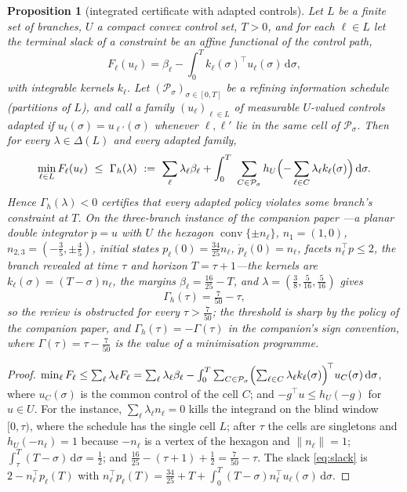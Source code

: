 \documentclass[11pt,a4paper]{article}
\theoremstyle{plain}
\newtheorem{proposition}[theorem]{Proposition}
\theoremstyle{definition}
\theoremstyle{remark}
\newcommand{\calP}{\mathcal{P}}
\newcommand{\conv}{\operatorname{conv}}
\newcommand{\tfr}[2]{\tfrac{#1}{#2}}
\newcommand{\dd}{\,\mathrm{d}}
\begin{document}
\begin{proposition}[integrated certificate with adapted controls]\label{prop:integrated}
Let $L$ be a finite set of branches, $U$ a compact convex control set, $T>0$, and for each $\ell\in L$ let the terminal slack of a constraint be an affine functional of the control path,
\begin{equation}\label{eq:slack}
F_\ell(u_\ell)=\beta_\ell-\int_0^T k_\ell(\sigma)^\top u_\ell(\sigma)\dd\sigma,
\end{equation}
with integrable kernels $k_\ell$. Let $(\calP_\sigma)_{\sigma\in[0,T]}$ be a refining information schedule (partitions of $L$), and call a family $(u_\ell)_{\ell\in L}$ of measurable $U$-valued controls \emph{adapted} if $u_\ell(\sigma)=u_{\ell'}(\sigma)$ whenever $\ell,\ell'$ lie in the same cell of $\calP_\sigma$. Then for every $\lambda\in\Delta(L)$ and every adapted family,
\begin{equation}\label{eq:gammah}
\min_{\ell\in L}F_\ell(u_\ell)\ \le\ \Gamma_h(\lambda)\ :=\ \sum_\ell\lambda_\ell\beta_\ell+\int_0^T\ \sum_{C\in\calP_\sigma}h_U\Bigl(-\sum_{\ell\in C}\lambda_\ell k_\ell(\sigma)\Bigr)\dd\sigma .
\end{equation}
Hence $\Gamma_h(\lambda)<0$ certifies that every adapted policy violates some branch's constraint at $T$. On the three-branch instance of the companion paper \cite{Abaee2026cert}---a planar double integrator $\ddot p=u$ with $U$ the hexagon $\conv\{\pm n_\ell\}$, $n_1=(1,0)$, $n_{2,3}=(-\tfr35,\pm\tfr45)$, initial states $p_\ell(0)=\tfr{34}{25}n_\ell$, $\dot p_\ell(0)=n_\ell$, facets $n_\ell^\top p\le2$, the branch revealed at time $\tau$ and horizon $T=\tau+1$---the kernels are $k_\ell(\sigma)=(T-\sigma)n_\ell$, the margins $\beta_\ell=\tfr{16}{25}-T$, and $\lambda=(\tfr38,\tfr5{16},\tfr5{16})$ gives
\begin{equation}\label{eq:gamma3}
\Gamma_h(\tau)=\tfrac{7}{50}-\tau ,
\end{equation}
so the review is obstructed for every $\tau>\tfr7{50}$; the threshold is sharp by the policy of the companion paper, and $\Gamma_h(\tau)=-\Gamma(\tau)$ in the companion's sign convention, where $\Gamma(\tau)=\tau-\tfr7{50}$ is the value of a minimisation programme.
\end{proposition}

\begin{proof}
$\min_\ell F_\ell\le\sum_\ell\lambda_\ell F_\ell=\sum_\ell\lambda_\ell\beta_\ell-\int_0^T\sum_{C\in\calP_\sigma}\Bigl(\sum_{\ell\in C}\lambda_\ell k_\ell(\sigma)\Bigr)^{\!\top}u_C(\sigma)\dd\sigma$, where $u_C(\sigma)$ is the common control of the cell $C$; and $-g^\top u\le h_U(-g)$ for $u\in U$. For the instance, $\sum_\ell\lambda_\ell n_\ell=0$ kills the integrand on the blind window $[0,\tau)$, where the schedule has the single cell $L$; after $\tau$ the cells are singletons and $h_U(-n_\ell)=1$ because $-n_\ell$ is a vertex of the hexagon and $\|n_\ell\|=1$; $\int_\tau^T(T-\sigma)\dd\sigma=\tfr12$; and $\tfr{16}{25}-(\tau+1)+\tfr12=\tfr7{50}-\tau$. The slack \eqref{eq:slack} is $2-n_\ell^\top p_\ell(T)$ with $n_\ell^\top p_\ell(T)=\tfr{34}{25}+T+\int_0^T(T-\sigma)n_\ell^\top u_\ell(\sigma)\dd\sigma$.
\end{proof}
\end{document}
